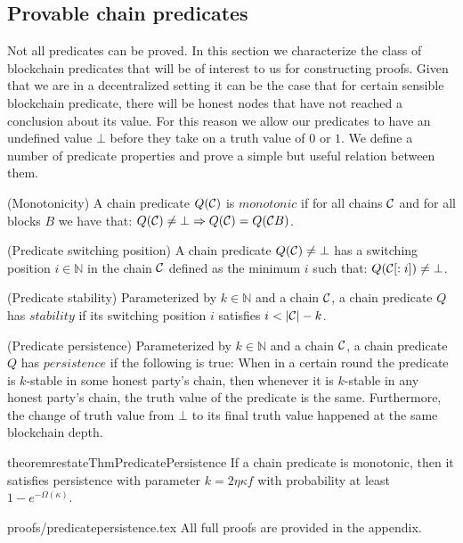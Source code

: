 \subsection{Provable chain predicates}

Not all predicates can be proved. In this section we characterize the class of
blockchain predicates that will be of interest to us for constructing proofs.
Given that we are in a decentralized setting it can be the case that for certain
sensible blockchain predicate, there will be honest nodes that have not reached
a conclusion about its value. For this reason we allow our predicates to have an
undefined value $\bot$ before they take on a truth value of $0$ or $1$. We
define a number of predicate properties and prove a simple but useful relation
between them.

\begin{definition}{(Monotonicity)}
    A chain predicate $Q(\mathcal{C})$ is $\textit{monotonic}$ if for all chains
    $\mathcal{C}$ and for all blocks $B$ we have that:
    $    Q(\mathcal{C}) \neq \bot \Rightarrow Q(\mathcal{C}) = Q(\mathcal{C} B) $.

{(Predicate switching position)}
    A chain predicate $Q(\mathcal{C}) \neq \bot$ has a switching position $i \in
    \mathbb{N}$ in the chain $\mathcal{C}$ defined as the minimum $i$ such that:
 $       Q(\mathcal{C}[:i]) \neq \bot$.

 {(Predicate stability)}
    Parameterized by $k \in \mathbb{N}$ and a chain $\mathcal{C}$, a chain predicate
    $Q$ has $\textit{stability}$ if its switching position $i$ satisfies $i <
    |\mathcal{C}| - k$.

{(Predicate persistence)}
    Parameterized by $k \in \mathbb{N}$ and a chain $\mathcal{C}$, a chain predicate
    $Q$ has $\textit{persistence}$ if the following is true: When in a certain
    round the predicate is $k$-stable in some honest party's chain, then
    whenever it is $k$-stable in any honest party's chain, the truth value of
    the predicate is the same. Furthermore, the change of truth value from
    $\bot$ to its final truth value happened at the same blockchain depth.
\end{definition}

\begin{restatable}{theorem}{restateThmPredicatePersistence}
    If a chain predicate is monotonic, then it satisfies persistence with
    parameter $k = 2\eta \kappa f$ with probability at least $1 -
    e^{-\Omega(\kappa)}$.
\end{restatable}
\ifonecolumn
    {proofs/predicatepersistence.tex}
\else
    All full proofs are provided in the appendix.
\fi

